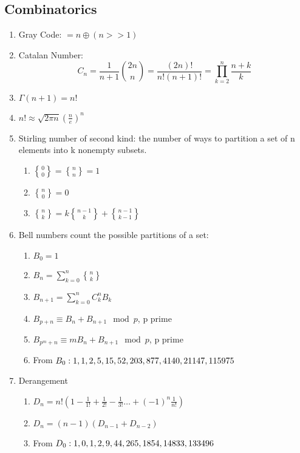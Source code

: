 \subsection{Combinatorics}
\DeclareRobustCommand{\stirling}{\genfrac\{\}{0pt}{}}
\begin{enumerate}
\itemsep = -3pt
  \item Gray Code: $=n\oplus (n>>1)$
  \item Catalan Number: $$C_n =  \frac{1}{n + 1} \binom{2n}{n} = \frac{(2n)!}{n!(n + 1)!} = \prod_{k=2}^n \frac{n + k}{k}$$
  \item $\Gamma(n + 1) = n!$
  \item $n! \approx \sqrt{2\pi n}  \left( \frac{n}{e} \right)^n$
  \item Stirling number of second kind: the number of ways to partition a set of n elements into k nonempty subsets.
	\begin{enumerate}\itemsep = -2pt
		\item $\stirling{0}{0} = \stirling{n}{n}=1$
		\item $\stirling{n}{0} = 0$
		\item $\stirling{n}{k} = k\stirling{n - 1}{k} + \stirling{n - 1}{k - 1}$
	\end{enumerate}
  \item Bell numbers count the possible partitions of a set:
	\begin{enumerate}\itemsep = -2pt
		\item $B_0=1$
		\item $B_n=\sum_{k=0}^n\stirling{n}{k}$
		\item $B_{n+1}=\sum_{k=0}^{n} C_k^n B_k$
		\item $B_{p+n}\equiv B{_n}+B_{n+1} \mod p$, p prime
		\item $B_{p^m+n}\equiv mB{_n}+B_{n+1} \mod p$, p prime
		\item From $B_0: 1,1,2,5,15,52,\\203,877,4140,21147,115975$
	\end{enumerate}
\item Derangement
	\begin{enumerate}\itemsep = -2pt
		\item $D_n=n!(1-\frac{1}{1!}+\frac{1}{2!}-\frac{1}{3!}\ldots +(-1)^n\frac{1}{n!})$
		\item $D_n=(n-1)(D_{n-1}+D_{n-2})$
		\item From $D_0: 1,0,1,2,9,44,\\265,1854,14833,133496$
	\end{enumerate}

\end{enumerate}
